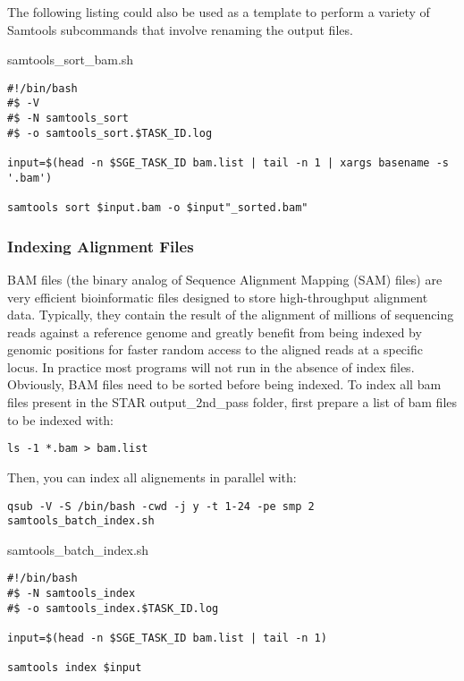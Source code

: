 The following listing could also be used as a template to perform a variety of Samtools subcommands that involve renaming the output files.

\noindent samtools\_sort\_bam.sh
\begin{verbatim}
#!/bin/bash
#$ -V
#$ -N samtools_sort
#$ -o samtools_sort.$TASK_ID.log

input=$(head -n $SGE_TASK_ID bam.list | tail -n 1 | xargs basename -s '.bam')

samtools sort $input.bam -o $input"_sorted.bam"

\end{verbatim}


\subsubsection{Indexing Alignment Files}

BAM files (the binary analog of Sequence Alignment Mapping (SAM) files) are very efficient bioinformatic files designed to store high-throughput alignment data. Typically, they contain the result of the alignment of millions of sequencing reads against a reference genome and greatly benefit from being indexed by genomic positions for faster random access to the aligned reads at a specific locus. In practice most programs will not run in the absence of index files. Obviously, BAM files need to be sorted before being indexed. To index all bam files present in the STAR output\_2nd\_pass folder, first prepare a list of bam files to be indexed with:

\begin{verbatim}
ls -1 *.bam > bam.list
\end{verbatim}

Then, you can index all alignements in parallel with:

\begin{verbatim}
qsub -V -S /bin/bash -cwd -j y -t 1-24 -pe smp 2 samtools_batch_index.sh
\end{verbatim}

\noindent samtools\_batch\_index.sh

\begin{verbatim}
#!/bin/bash
#$ -N samtools_index
#$ -o samtools_index.$TASK_ID.log

input=$(head -n $SGE_TASK_ID bam.list | tail -n 1)

samtools index $input
\end{verbatim}





